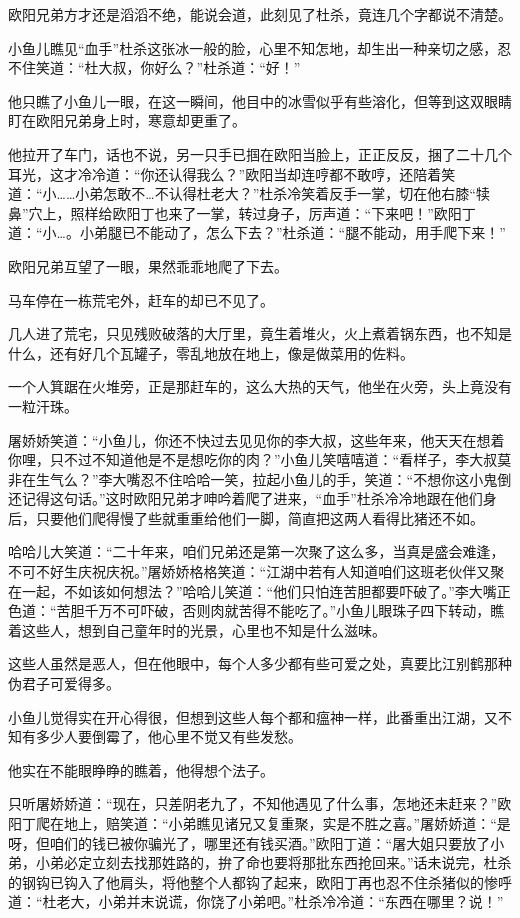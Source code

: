 \documentclass[12pt,oneside]{book}
\begin{document}
欧阳兄弟方才还是滔滔不绝，能说会道，此刻见了杜杀，竟连几个字都说不清楚。

小鱼儿瞧见``血手''杜杀这张冰一般的脸，心里不知怎地，却生出一种亲切之感，忍不住笑道：``杜大叔，你好么？''杜杀道：``好！''

他只瞧了小鱼儿一眼，在这一瞬间，他目中的冰雪似乎有些溶化，但等到这双眼睛盯在欧阳兄弟身上时，寒意却更重了。

他拉开了车门，话也不说，另一只手已掴在欧阳当脸上，正正反反，捆了二十几个耳光，这才冷冷道：``你还认得我么？''欧阳当却连哼都不敢哼，还陪着笑道：``小\ldots\ldots 小弟怎敢不\ldots 不认得杜老大？''杜杀冷笑着反手一掌，切在他右膝``犊鼻''穴上，照样给欧阳丁也来了一掌，转过身子，厉声道：``下来吧！''欧阳丁道：``小\ldots。小弟腿已不能动了，怎么下去？''杜杀道：``腿不能动，用手爬下来！''

欧阳兄弟互望了一眼，果然乖乖地爬了下去。

马车停在一栋荒宅外，赶车的却已不见了。

几人进了荒宅，只见残败破落的大厅里，竟生着堆火，火上煮着锅东西，也不知是什么，还有好几个瓦罐子，零乱地放在地上，像是做菜用的佐料。

一个人箕踞在火堆旁，正是那赶车的，这么大热的天气，他坐在火旁，头上竟没有一粒汗珠。

屠娇娇笑道：``小鱼儿，你还不快过去见见你的李大叔，这些年来，他天天在想着你哩，只不过不知道他是不是想吃你的肉？''小鱼儿笑嘻嘻道：``看样子，李大叔莫非在生气么？''李大嘴忍不住哈哈一笑，拉起小鱼儿的手，笑道：``不想你这小鬼倒还记得这句话。''这时欧阳兄弟才呻吟着爬了进来，``血手''杜杀冷冷地跟在他们身后，只要他们爬得慢了些就重重给他们一脚，简直把这两人看得比猪还不如。

哈哈儿大笑道：``二十年来，咱们兄弟还是第一次聚了这么多，当真是盛会难逢，不可不好生庆祝庆祝。''屠娇娇格格笑道：``江湖中若有人知道咱们这班老伙伴又聚在一起，不如该如何想法？''哈哈儿笑道：``他们只怕连苦胆都要吓破了。''李大嘴正色道：``苦胆千万不可吓破，否则肉就苦得不能吃了。''小鱼儿眼珠子四下转动，瞧着这些人，想到自己童年时的光景，心里也不知是什么滋味。

这些人虽然是恶人，但在他眼中，每个人多少都有些可爱之处，真要比江别鹤那种伪君子可爱得多。

小鱼儿觉得实在开心得很，但想到这些人每个都和瘟神一样，此番重出江湖，又不知有多少人要倒霉了，他心里不觉又有些发愁。

他实在不能眼睁睁的瞧着，他得想个法子。

只听屠娇娇道：``现在，只差阴老九了，不知他遇见了什么事，怎地还未赶来？''欧阳丁爬在地上，赔笑道：``小弟瞧见诸兄又复重聚，实是不胜之喜。''屠娇娇道：``是呀，但咱们的钱已被你骗光了，哪里还有钱买酒。''欧阳丁道：``屠大姐只要放了小弟，小弟必定立刻去找那姓路的，拚了命也要将那批东西抢回来。''话未说完，杜杀的钢钩已钩入了他肩头，将他整个人都钩了起来，欧阳丁再也忍不住杀猪似的惨呼道：``杜老大，小弟并末说谎，你饶了小弟吧。''杜杀冷冷道：``东西在哪里？说！''
\end{document}
